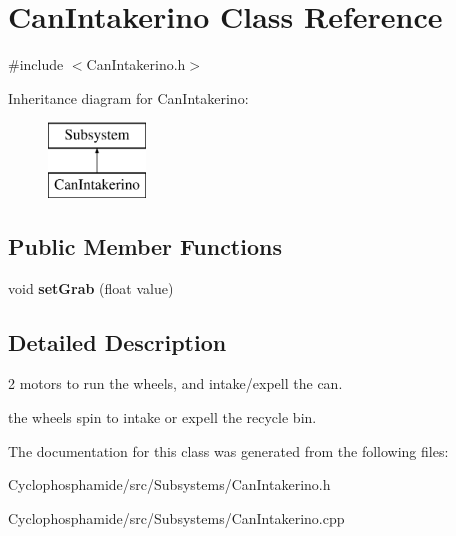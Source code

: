 \hypertarget{class_can_intakerino}{}\section{Can\+Intakerino Class Reference}
\label{class_can_intakerino}


{\ttfamily \#include $<$Can\+Intakerino.\+h$>$}

Inheritance diagram for Can\+Intakerino\+:\begin{figure}[H]
\begin{center}
\leavevmode
\includegraphics[height=2.000000cm]{class_can_intakerino}
\end{center}
\end{figure}
\subsection*{Public Member Functions}
\begin{DoxyCompactItemize}
\item 
\hypertarget{class_can_intakerino_a439ef3fdbc09691bdeb8db5e3f632a17}{}void {\bfseries set\+Grab} (float value)\label{class_can_intakerino_a439ef3fdbc09691bdeb8db5e3f632a17}

\end{DoxyCompactItemize}


\subsection{Detailed Description}
2 motors to run the wheels, and intake/expell the can.

the wheels spin to intake or expell the recycle bin. 

The documentation for this class was generated from the following files\+:\begin{DoxyCompactItemize}
\item 
Cyclophosphamide/src/\+Subsystems/Can\+Intakerino.\+h\item 
Cyclophosphamide/src/\+Subsystems/Can\+Intakerino.\+cpp\end{DoxyCompactItemize}
